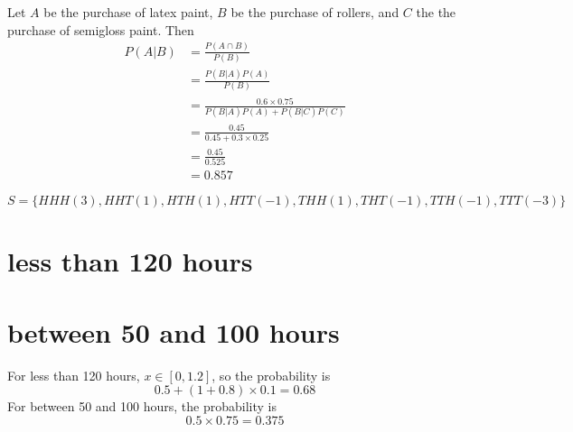 \documentclass[answers]{exam}
\begin{document}
\begin{questions}
\begin{solution}
	Let $A$ be the purchase of latex paint, $B$ be the purchase of rollers, and $C$ the the purchase of semigloss paint. Then
	\begin{align*}
		P(A|B) &= \frac{P(A\cap B)}{P(B)} \\
		       &= \frac{P(B|A)P(A)}{P(B)} \\
		       &= \frac{0.6\times0.75}{P(B|A)P(A) + P(B|C)P(C)} \\
		       &= \frac{0.45}{0.45 + 0.3\times0.25} \\
		       &= \frac{0.45}{0.525} \\
		       &= 0.857
	\end{align*}
\end{solution}


\begin{solution}
	$$S = \{HHH(3), HHT(1), HTH(1), HTT(-1), THH(1), THT(-1), TTH(-1), TTT(-3)\}$$
\end{solution}


\begin{parts}
\part{less than 120 hours}
\part{between 50 and 100 hours}
\end{parts}

\begin{solution}
	For less than 120 hours, $x \in [0,1.2]$, so the probability is
	$$0.5 + (1+0.8)\times0.1 = 0.68$$
	For between 50 and 100 hours, the probability is
	$$0.5\times0.75 = 0.375$$
\end{solution}


\end{questions}
\end{document}
